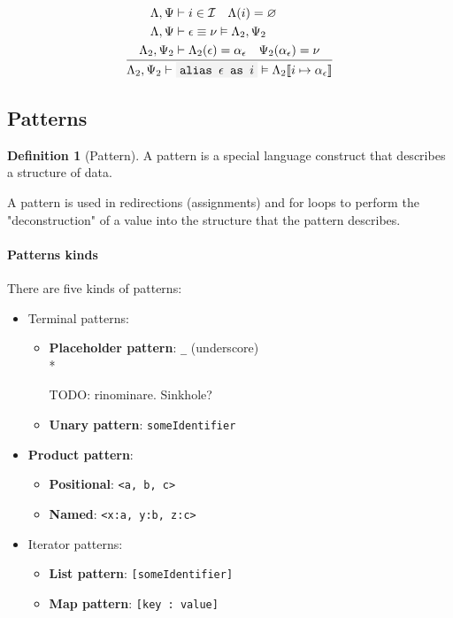 \documentclass[11pt]{report}
\newcommand{\oprule}[3][gathered]{\frac{\begin{#1}#2\end{#1}}{\begin{gathered}#3\end{gathered}}}
\newcommand{\then}{\vdash}
\newcommand{\Then}{\vDash}
\newcommand{\code}[1]{\texttt{\colorbox{gray!10}{#1}}}
\newcommand{\addr}{\alpha}
\newcommand{\expr}{\epsilon}
\newcommand{\val}{\nu}
\newcommand{\Id}{\mathcal{I}}
\newcommand{\env}[1]{[\![#1]\!]}
\newcommand{\EnvLoc}{\Lambda}
\newcommand{\EnvStore}{\Psi}
\theoremstyle{definition}
\newtheorem{definition}{Definition}[section]
\newcommand{\comment}[1]{
	\parbox{0.9\linewidth}{\color{black!30}\small\sffamily #1}
}
\begin{document}
\[
	\oprule[aligned]{
		\EnvLoc,\EnvStore     &\then i \in \Id \quad \EnvLoc(i) = \varnothing \\*
		\EnvLoc,\EnvStore     &\then \expr \equiv \val \Then \EnvLoc_2,\EnvStore_2 \\*
		\EnvLoc_2,\EnvStore_2 &\then \EnvLoc_2(\expr) = \addr_\expr \quad \EnvStore_2(\addr_\expr) = \val \\*
	}{
		\EnvLoc_2,\EnvStore_2\then \code{alias $\expr$ as $i$} \Then \EnvLoc_2\env{i \mapsto \addr_\expr}
	}
\]

\newpage

\subsection{Patterns}

\begin{definition}[Pattern]
	A pattern is a special language construct that describes a structure of
	data.
\end{definition}

A pattern is used in redirections (assignments) and for loops to perform the
"deconstruction" of a value into the structure that the pattern describes.

\paragraph{Patterns kinds} There are five kinds of patterns:
\begin{itemize}
	\item Terminal patterns:
		\begin{itemize}
			\item \textbf{Placeholder pattern}: \code{\_} (underscore)\\*
				\comment{TODO: rinominare. Sinkhole?}
			\item \textbf{Unary pattern}: \code{someIdentifier}
		\end{itemize}
	\item \textbf{Product pattern}:
		\begin{itemize}
			\item \textbf{Positional}: \code{<a, b, c>}
			\item \textbf{Named}: \code{<x:a, y:b, z:c>}
		\end{itemize}
	\item Iterator patterns:
		\begin{itemize}
			\item \textbf{List pattern}: \code{[someIdentifier]}
			\item \textbf{Map pattern}: \code{[key : value]}
		\end{itemize}
\end{itemize}
\end{document}
